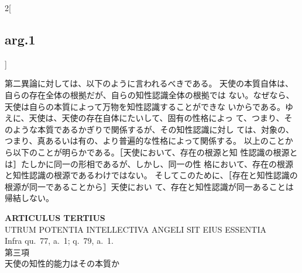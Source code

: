 \documentclass[paper=a4paper,fontsize=10pt,jafontsize=9pt,titlepage]{jlreq}
\begin{document}
\begin{paracol}{2}[\subsection{arg.1}]
\switchcolumn

第二異論に対しては、以下のように言われるべきである。
天使の本質自体は、自らの存在全体の根拠だが、自らの知性認識全体の根拠では
 ない。なぜなら、天使は自らの本質によって万物を知性認識することができな
 いからである。ゆえに、天使は、天使の存在自体にたいして、固有の性格によっ
 て、つまり、そのような本質であるかぎりで関係するが、その知性認識に対し
 ては、対象の、つまり、真あるいは有の、より普遍的な性格によって関係する。
 以上のことから以下のことが明らかである。［天使において、存在の根源と知
 性認識の根源とは］たしかに同一の形相であるが、しかし、同一の性
 格において、存在の根源と知性認識の根源であるわけではない。
そしてこのために、［存在と知性認識の根源が同一であることから］天使におい
 て、存在と知性認識が同一あることは帰結しない。

\end{paracol}
\newpage
{}
{}
\setcounter{section}{3}
\setcounter{subsection}{0}



\begin{center}
 {\Large {\bfseries ARTICULUS TERTIUS}}\\
 {\large UTRUM POTENTIA INTELLECTIVA ANGELI SIT EIUS ESSENTIA}\\
 {\footnotesize Infra qu.~77, a.~1; q.~79, a.~1.}\\
 {\Large 第三項\\天使の知性的能力はその本質か}
\end{center}
\end{document}
